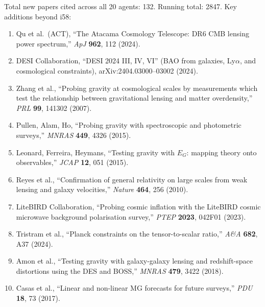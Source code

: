 \documentclass[11pt,a4paper]{article}
\begin{document}
Total new papers cited across all 20 agents: 132. Running total: 2847. Key additions beyond i58:

\begin{enumerate}
\item Qu et al.\ (ACT), ``The Atacama Cosmology Telescope: DR6 CMB lensing power spectrum,'' \textit{ApJ} \textbf{962}, 112 (2024).
\item DESI Collaboration, ``DESI 2024 III, IV, VI'' (BAO from galaxies, Ly$\alpha$, and cosmological constraints), arXiv:2404.03000--03002 (2024).
\item Zhang et al., ``Probing gravity at cosmological scales by measurements which test the relationship between gravitational lensing and matter overdensity,'' \textit{PRL} \textbf{99}, 141302 (2007).
\item Pullen, Alam, Ho, ``Probing gravity with spectroscopic and photometric surveys,'' \textit{MNRAS} \textbf{449}, 4326 (2015).
\item Leonard, Ferreira, Heymans, ``Testing gravity with $E_G$: mapping theory onto observables,'' \textit{JCAP} \textbf{12}, 051 (2015).
\item Reyes et al., ``Confirmation of general relativity on large scales from weak lensing and galaxy velocities,'' \textit{Nature} \textbf{464}, 256 (2010).
\item LiteBIRD Collaboration, ``Probing cosmic inflation with the LiteBIRD cosmic microwave background polarisation survey,'' \textit{PTEP} \textbf{2023}, 042F01 (2023).
\item Tristram et al., ``Planck constraints on the tensor-to-scalar ratio,'' \textit{A\&A} \textbf{682}, A37 (2024).
\item Amon et al., ``Testing gravity with galaxy-galaxy lensing and redshift-space distortions using the DES and BOSS,'' \textit{MNRAS} \textbf{479}, 3422 (2018).
\item Casas et al., ``Linear and non-linear MG forecasts for future surveys,'' \textit{PDU} \textbf{18}, 73 (2017).
\end{enumerate}
\end{document}
